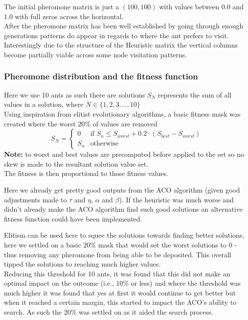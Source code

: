 \documentclass[11pt]{article}
\begin{document}
The initial pheromone matrix is just a $(100, 100)$ with values between $0.0$ and $1.0$ with full zeros across the horizontal. \\

\noindent After the pheromone matrix has been well established by going through enough generations patterns do appear in regards to where the ant prefers to visit. Interestingly due to the structure of the Heuristic matrix the vertical columns become partially viable across some node visitation patterns. 

\subsubsection{Pheromone distribution and the fitness function}

Here we use 10 ants as such there are solutions $S_N$ represents the sum of all values in a solution, where $N \in \{1, 2, 3... ., 10\}$ \\

\noindent Using inspiration from elitist evolutionary algorithms, a basic fitness mask was created where the worst $20\%$ of values are removed
$$
S_{N} =
\begin{cases}
0 & \text{if } S_n \leq S_{worst} + 0.2 \cdot (S_{best} - S_{worst}) \\{S_n} & \text{otherwise}
\end{cases}
$$
\textbf{Note:} to worst and best values are precomputed before applied to the set so no skew is made to the resultant solution value set. \\

\noindent The fitness is then proportional to those fitness values. 

Here we already get pretty good outputs from the ACO algorithm (given good adjustments made to $\tau$ and $\eta$, $\alpha$ and $\beta$). If the heuristic was much worse and didn't already make the ACO algorithm find such good solutions an alternative fitness function could have been implemented. 

Elitism can be used here to squee the solutions towards finding better solutions, here we settled on a basic $20\%$ mask that would set the worst solutions to 0 - thus removing any pheromone from being able to be deposited. This overall tipped the solutions to reaching much higher values. \\

\noindent Reducing this threshold for 10 ants, it was found that this did not make an optimal impact on the outcome (i.e., 10\% or less) and where the threshold was much higher it was found that yes at first it would continue to get better but when it reached a certain margin, this started to impact the ACO's ability to search. As such the 20\% was settled on as it aided the search process. \\
\end{document}
